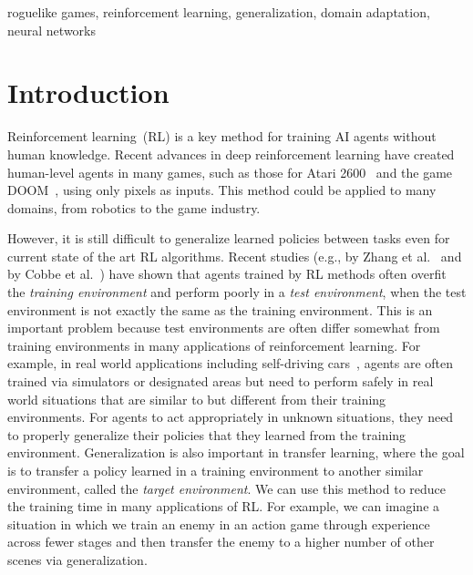 \documentclass[conference]{IEEEtran}
\newcommand\zhang{Zhang et al.~\cite{Zhang1804}}
\newcommand\cobbe{Cobbe et al.~\cite{Coinrun}}
\begin{document}
\begin{IEEEkeywords}
roguelike games, reinforcement learning, generalization,
domain adaptation, neural networks
\end{IEEEkeywords}

\section{Introduction} \label{intro}
Reinforcement learning~(RL) is a key method for training
AI agents without human knowledge.
Recent advances in deep reinforcement learning have created human-level
agents in many games, such as those for Atari 2600~\cite{DQN} and
the game DOOM~\cite{MnihBMGLHSK16}, using only pixels as inputs.
This method could be applied to many domains, from robotics to the game
industry.

However, it is still difficult to generalize learned policies between
tasks even for current state of the art RL algorithms.
Recent studies (e.g., by \zhang{} and by \cobbe{}) have shown that agents
trained by RL methods often overfit the \textit{training environment}
and perform poorly in a \textit{test environment}, when the test
environment is not exactly the same as the training environment.
This is an important problem because test environments are often
differ somewhat from training environments in many applications of
reinforcement learning.
For example, in real world applications including self-driving
cars~\cite{DriveInaDay}, agents are often trained via simulators or
designated areas but need to perform safely in real world situations
that are similar to but different from their training environments.
For agents to act appropriately in unknown situations, they need to
properly generalize their policies that they learned from the training
environment.
Generalization is also important in transfer learning, where the goal is
to transfer a policy learned in a training environment to another
similar environment, called the \textit{target environment}.
We can use this method to reduce the training time in many applications
of RL.
For example, we can imagine a situation in which we train an enemy in an
action game through experience across fewer stages and then transfer 
the enemy to a higher number of other scenes via generalization.
\end{document}
